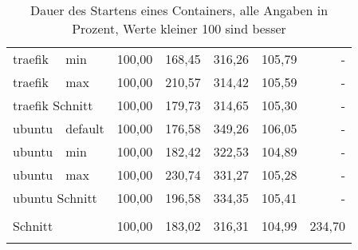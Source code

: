 \begin{footnotesize}
\begin{longtable}{llrrrrr}
		traefik                  & min             & 100,00 & 168,45 & 316,26  & 105,79                         & -      \\
		traefik                  & max             & 100,00 & 210,57 & 314,42  & 105,59                         & -      \\ \hline
		\multicolumn{2}{l}{traefik Schnitt}        & 100,00 & 179,73 & 314,65  & 105,30                         & -      \\ \hline
		ubuntu                   & default         & 100,00 & 176,58 & 349,26  & 106,05                         & -      \\
		ubuntu                   & min             & 100,00 & 182,42 & 322,53  & 104,89                         & -      \\
		ubuntu                   & max             & 100,00 & 230,74 & 331,27  & 105,28                         & -      \\ \hline
		\multicolumn{2}{l}{ubuntu Schnitt}         & 100,00 & 196,58 & 334,35  & 105,41                         & -      \\ \hline
		&                 &        &        &         &                                &        \\ \hline
		\multicolumn{2}{l}{Schnitt}                & 100,00 & 183,02 & 316,31  & 104,99                         & 234,70 \\ 
		\hline
	\caption[Dauer des Startens eines Containers]{Dauer des Startens eines Containers, \footnotesize alle Angaben in Prozent, Werte kleiner 100 sind besser}
	\label{tbl:timeuperfergebnis}
	\end{longtable}
\end{footnotesize}

